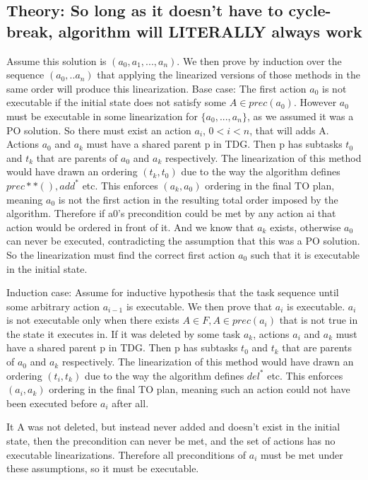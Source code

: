 \subsection{Theory: So long as it doesn't have to cycle-break, algorithm will LITERALLY always work}
 Assume this solution is $(a_0, a_1, ..., a_n)$. We then prove by induction over the sequence $(a_0, .. a_n)$ that applying the linearized versions of those methods in the same order will produce this linearization.
		Base case: The first action $a_0$ is not executable if the initial state does not satisfy some $A \in prec(a_0)$.
	However $a_0$ must be executable in some linearization for $\{a_0, ..., a_n\}$, as we assumed it was a PO solution. So there must exist an action $a_i$, $0 < i < n$, that will adds A. Actions $a_0$ and $a_k$ must have a shared parent p in TDG. Then p has subtasks $t_0$ and $t_k$ that are parents of $a_0$ and $a_k$ respectively. The linearization of this method would have drawn an ordering $(t_k, t_0)$ due to the way the algorithm defines $prec*{*}(), add^{*}$ etc. This enforces $(a_k, a_0)$ ordering in the final TO plan, meaning $a_0$ is not the first action in the resulting total order imposed by the algorithm. Therefore if a0’s precondition could be met by any action ai that action would be ordered in front of it. 
	And we know that $a_k$ exists, otherwise $a_0$ can never be executed, contradicting the assumption that this was a PO solution. So the linearization must find the correct first action $a_0$ such that it is executable in the initial state.
	
	Induction case:  Assume for inductive hypothesis that the task sequence until some arbitrary action $a_{i-1}$ is executable. We then prove that $a_i$ is executable.
	$a_i$ is not executable only when there exists $A \in F, A \in prec(a_i)$ that is not true in the state it executes in.
	If it was deleted by some task $a_k$, actions $a_i$ and $a_k$ must have a shared parent p in TDG. Then p has subtasks $t_0$ and $t_k$ that are parents of $a_0$ and $a_k$ respectively. The linearization of this method would have drawn an ordering $(t_i, t_k)$ due to the way the algorithm defines $del^{*}$ etc. This enforces $(a_i, a_k)$ ordering in the final TO plan, meaning such an action could not have been executed before $a_i$ after all.
	
	It A was not deleted, but instead never added and doesn't exist in the initial state, then the precondition can never be met, and the set of actions has no executable linearizations.
	Therefore all preconditions of $a_i$ must be met under these assumptions, so it must be executable.
	
